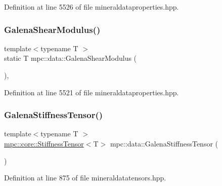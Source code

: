 Definition at line 5526 of file mineraldataproperties.\+hpp.

\mbox{\label{namespacempc_1_1data_a6f0e6fec4c5eed084981f6c1359e26e1}} 
\subsubsection{\texorpdfstring{Galena\+Shear\+Modulus()}{GalenaShearModulus()}}
{\footnotesize\ttfamily template$<$typename T $>$ \\
static T mpc\+::data\+::\+Galena\+Shear\+Modulus (\begin{DoxyParamCaption}{ }\end{DoxyParamCaption})\hspace{0.3cm}{\ttfamily [inline]}, {\ttfamily [static]}}



Definition at line 5521 of file mineraldataproperties.\+hpp.

\mbox{\label{namespacempc_1_1data_ae7eeb0183f6f910c6a85d453d995d519}} 
\subsubsection{\texorpdfstring{Galena\+Stiffness\+Tensor()}{GalenaStiffnessTensor()}}
{\footnotesize\ttfamily template$<$typename T $>$ \\
\mbox{\hyperlink{structmpc_1_1core_1_1_stiffness_tensor}{mpc\+::core\+::\+Stiffness\+Tensor}}$<$T$>$ mpc\+::data\+::\+Galena\+Stiffness\+Tensor (\begin{DoxyParamCaption}{ }\end{DoxyParamCaption})}



Definition at line 875 of file mineraldatatensors.\+hpp.

\mbox{\label{namespacempc_1_1data_a523244ec5b00d796a3f7f5ecf546d6b5}} 
